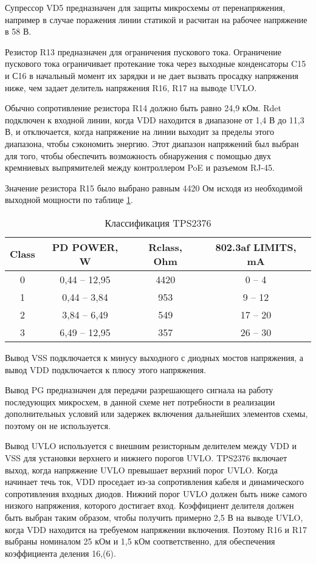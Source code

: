 Супрессор VD5 предназначен для защиты микросхемы от перенапряжения, например в случае поражения
линии статикой и расчитан на рабочее напряжение в 58 В. 

Резистор R13 предназначен для ограничения пускового тока. Ограничение пускового тока ограничивает
протекание тока через выходные конденсаторы C15 и С16 в начальный момент их зарядки и не дает 
вызвать просадку напряжения ниже, чем задает делитель напряжения R16, R17 на выводе UVLO.  

Обычно сопротивление резистора R14 должно быть равно 24,9 кОм. Rdet подключен к входной линии, 
когда VDD находится в диапазоне от 1,4 В до 11,3 В, и отключается,
когда напряжение на линии выходит за пределы этого диапазона, чтобы сэкономить энергию.
Этот диапазон напряжений был выбран для того, чтобы обеспечить возможность обнаружения с 
помощью двух кремниевых выпрямителей между контроллером PoE и разъемом RJ-45.

Значение резистора R15 было выбрано равным 4420 Ом исходя из 
необходимой выходной мощности по таблице \ref{ClassTPS2376}.

\begin{table}[H]
    \caption{Классификация TPS2376} 
    \label{ClassTPS2376}
    \begin{center}
    \begin{tabular}{|c|c|c|c|}
    \hline
    Class & PD POWER, W  &  Rclass, Ohm   & 802.3af LIMITS, mA \\ \hline
    0 & 0,44 -- 12,95  & 4420 &0 -- 4  \\ \hline
    1 & 0,44 -- 3,84 & 953 & 9 -- 12   \\ \hline
    2 & 3,84 -- 6,49 & 549 & 17 -- 20  \\ \hline
    3 & 6,49 -- 12,95 & 357 & 26 -- 30   \\ \hline
    \end{tabular}
    \end{center}
\end{table} 

Вывод VSS подключается к минусу выходного с диодных мостов напряжения, 
а вывод VDD подключается к плюсу этого напряжения.

Вывод PG предназначен для передачи разрешающего сигнала на работу последующих микросхем,
в данной схеме нет потребности в реализации дополнительных условий или задержек включения
дальнейших элементов схемы, поэтому он не используется.

Вывод UVLO используется с внешним резисторным делителем между VDD и VSS для установки 
верхнего и нижнего порогов UVLO. TPS2376 включает выход, когда напряжение UVLO превышает верхний 
порог UVLO. Когда начинает течь ток, VDD проседает из-за сопротивления кабеля и динамического 
сопротивления входных диодов. Нижний порог UVLO должен быть ниже самого низкого напряжения, 
которого достигает вход. Коэффициент делителя должен быть выбран таким образом, 
чтобы получить примерно 2,5 В на выводе UVLO, когда VDD находится на требуемом 
напряжении включения. Поэтому R16 и R17 выбраны номиналом 25 кОм и 1,5 кОм соответственно,
для обеспечения коэффициента деления 16,(6).

